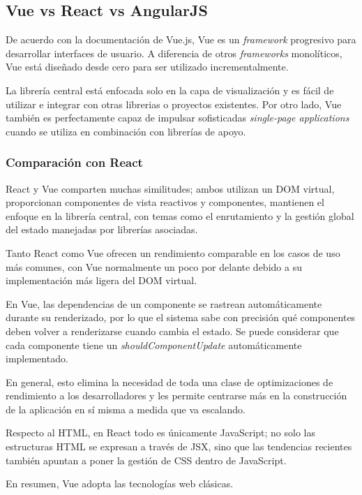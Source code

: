 \subsection{Vue vs React vs AngularJS}
De acuerdo con la documentación de Vue.js\cite{noauthor_que_nodate}, Vue es un \textit{framework} progresivo para desarrollar interfaces de usuario. A diferencia de otros \textit{frameworks} monolíticos, Vue está diseñado desde cero para ser utilizado incrementalmente.


La librería central está enfocada solo en la capa de visualización y es fácil de utilizar e integrar con otras librerias o proyectos existentes. Por otro lado, Vue también es perfectamente capaz de impulsar sofisticadas \textit{single-page applications} cuando se utiliza en combinación con librerías de apoyo.


\subsubsection*{Comparación con React}

React y Vue comparten muchas similitudes; ambos utilizan un DOM virtual, proporcionan componentes de vista reactivos y componentes, mantienen el enfoque en la librería central, con temas como el enrutamiento y la gestión global del estado manejadas por librerías asociadas.


Tanto React como Vue ofrecen un rendimiento comparable en los casos de uso más comunes, con Vue normalmente un poco por delante debido a su implementación más ligera del DOM virtual.


En Vue, las dependencias de un componente se rastrean automáticamente durante su renderizado, por lo que el sistema sabe con precisión qué componentes deben volver a renderizarse cuando cambia el estado. Se puede considerar que cada componente tiene un \textit{shouldComponentUpdate} automáticamente implementado.


En general, esto elimina la necesidad de toda una clase de optimizaciones de rendimiento a los desarrolladores y les permite centrarse más en la construcción de la aplicación en sí misma a medida que va escalando.


Respecto al HTML, en React todo es únicamente JavaScript; no solo las estructuras HTML se expresan a través de JSX, sino que las tendencias recientes también apuntan a poner la gestión de CSS dentro de JavaScript.


En resumen, Vue adopta las tecnologías web clásicas.


